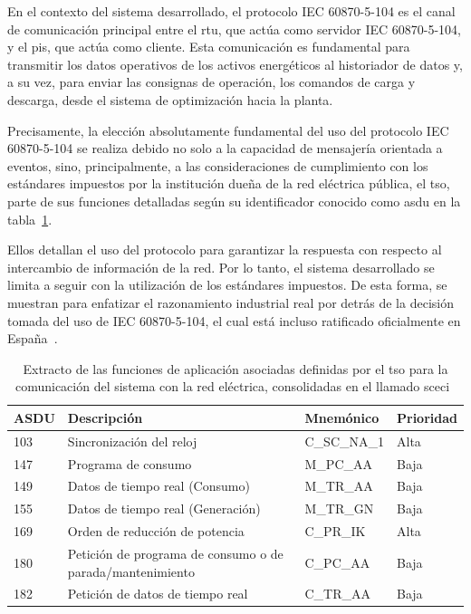 En el contexto del sistema desarrollado, el protocolo IEC 60870-5-104 es el canal de comunicación principal entre el \gls{rtu}, que actúa como servidor IEC 60870-5-104, y el \gls{pis}, que actúa como cliente. Esta comunicación es fundamental para transmitir los datos operativos de los activos energéticos al historiador de datos y, a su vez, para enviar las consignas de operación, los comandos de carga y descarga, desde el sistema de optimización hacia la planta.

Precisamente, la elección absolutamente fundamental del uso del protocolo IEC 60870-5-104 se realiza debido no solo a la capacidad de mensajería orientada a eventos, sino, principalmente, a las consideraciones de cumplimiento con los estándares impuestos por la institución dueña de la red eléctrica pública, el \gls{tso}, parte de sus funciones detalladas según su identificador conocido como \gls{asdu} en la tabla~\ref{tab:funciones-de-aplicación-red}.

Ellos detallan el uso del protocolo para garantizar la respuesta con respecto al intercambio de información de la red. Por lo tanto, el sistema desarrollado se limita a seguir con la utilización de los estándares impuestos. De esta forma, se muestran para enfatizar el razonamiento industrial real por detrás de la decisión tomada del uso de IEC 60870-5-104, el cual está incluso ratificado oficialmente en España~\cite{une2017equipos}.

\begin{table}[ht]
  \centering
  \begin{tabular}{|l|p{7.5cm}|l|l|}
    \hline
    ASDU & Descripción                                               & Mnemónico   & Prioridad \\
    \hline
    103  & Sincronización del reloj                                  & C\_SC\_NA\_1 & Alta     \\
    147  & Programa de consumo                                       & M\_PC\_AA    & Baja     \\
    149  & Datos de tiempo real (Consumo)                            & M\_TR\_AA    & Baja     \\
    155  & Datos de tiempo real (Generación)                         & M\_TR\_GN    & Baja     \\
    169  & Orden de reducción de potencia                            & C\_PR\_IK    & Alta     \\
    180  & Petición de programa de consumo o de parada/mantenimiento & C\_PC\_AA    & Baja     \\
    182  & Petición de datos de tiempo real                          & C\_TR\_AA    & Baja     \\
    \hline
  \end{tabular}
  \caption{Extracto de las funciones de aplicación asociadas definidas por el \gls{tso} para la comunicación del sistema con la red eléctrica, consolidadas en el llamado \gls{sceci}~\cite{ree2009protocolo}}
  \label{tab:funciones-de-aplicación-red}
\end{table}

